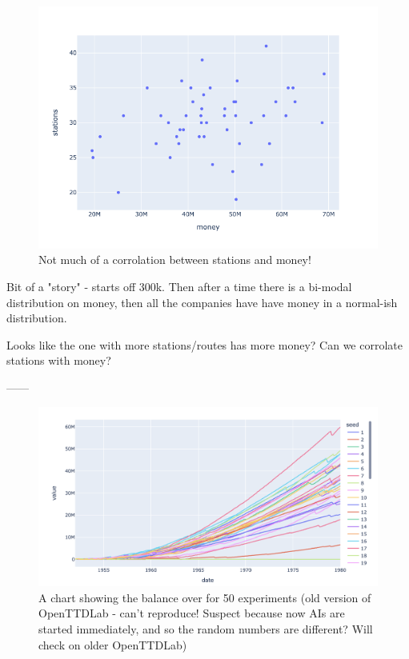 \documentclass[logo,msc]{infthesis}           %
\begin{document}
\begin{figure}[h]
\centering
\includegraphics[width=\columnwidth]{assets/stations_vs_money.png}
\caption{Not much of a corrolation between stations and money!}
\label{fig:openttd}
\end{figure}

Bit of a "story" - starts off 300k. Then after a time there is a bi-modal distribution on money, then all the companies have have money in a normal-ish distribution.

Looks like the one with more stations/routes has more money? Can we corrolate stations with money?




------

\begin{figure}[h]
\centering
\includegraphics[width=\columnwidth]{assets/value-over-time.png}
\caption{A chart showing the balance over for 50 experiments (old version of OpenTTDLab - can't reproduce! Suspect because now AIs are started immediately, and so the random numbers are different? Will check on older OpenTTDLab)}
\label{fig:value-over-time}
\end{figure}
\end{document}
